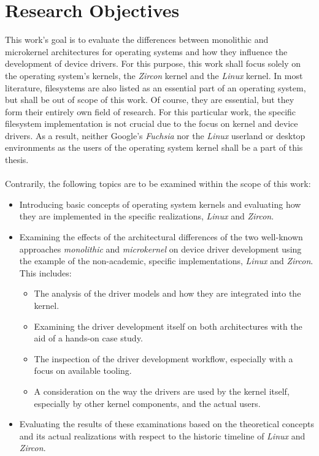 \section{Research Objectives}\label{sec:research-objectives}
This work's goal is to evaluate the differences between monolithic and microkernel architectures for operating systems and how they influence the development of device drivers.
For this purpose, this work shall focus solely on the operating system's kernels, the \textit{Zircon} kernel and the \textit{Linux} kernel.
In most literature, filesystems are also listed as an essential part of an operating system, but shall be out of scope of this work.
Of course, they are essential, but they form their entirely own field of research.
For this particular work, the specific filesystem implementation is not crucial due to the focus on kernel and device drivers.
As a result, neither Google's \textit{Fuchsia} nor the \textit{Linux} userland or desktop environments as the users of the operating system kernel shall be a part of this thesis.\\
\\
Contrarily, the following topics are to be examined within the scope of this work:
\begin{itemize}
    \item Introducing basic concepts of operating system kernels and evaluating how they are implemented in the specific realizations, \textit{Linux} and \textit{Zircon}.
    \item Examining the effects of the architectural differences of the two well-known approaches \textit{monolithic} and \textit{microkernel} on device driver development using the example of the non-academic, specific implementations, \textit{Linux} and \textit{Zircon}. This includes:  
        \begin{itemize}
            \item The analysis of the driver models and how they are integrated into the kernel.
            \item Examining the driver development itself on both architectures with the aid of a hands-on case study.
            \item The inspection of the driver development workflow, especially with a focus on available tooling. 
            \item A consideration on the way the drivers are used by the kernel itself, especially by other kernel components, and the actual users.
        \end{itemize}
    \item Evaluating the results of these examinations based on the theoretical concepts and its actual realizations with respect to the historic timeline of \textit{Linux} and \textit{Zircon}.
\end{itemize}

